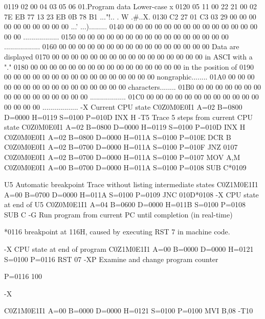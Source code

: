 0119 02 00 04 03 05 06 01.Program data         Lower-case x
0120 05 11 00 22 21 00 02 7E EB 77 13 23 EB 0B 78 B1 ..."!.. . W .#..X.
0130 C2 27 01 C3 03 29 00 00 00 00 00 00 00 00 00 00 ...' ...).........
0140 00 00 00 00 00 00 00 00 00 00 00 00 00 00 00 00 ..................
0150 00 00 00 00 00 00 00 00 00 00 00 00 00 00 00 00 ..................
0160 00 00 00 00 00 00 00 00 00 00 00 00 00 00 00 00 Data are displayed
0170 00 00 00 00 00 00 00 00 00 00 00 00 00 00 00 00 in ASCI with a "."
0180 00 00 00 00 00 00 00 00 00 00 00 00 00 00 00 00 in the position of
0190 00 00 00 00 00 00 00 00 00 00 00 00 00 00 00 00 nongraphic........
01A0 00 00 00 00 00 00 00 00 00 00 00 00 00 00 00 00 characters........
01B0 00 00 00 00 00 00 00 00 00 00 00 00 00 00 00 00 ..................
01C0 00 00 00 00 00 00 00 00 00 00 00 00 00 00 00 00 ..................
-X
           Current CPU state
C0Z0M0E0I1 A=02 B=0800 D=0000 H=0119 S=0100 P=010D INX H
-T5
     Trace 5 steps from current CPU state
C0Z0M0E0I1 A=02 B=0800 D=0000 H=0119 S=0100 P=010D INX H
C0Z0M0E0I1 A=02 B=0800 D=0000 H=011A S=0100 P=010E DCR B
C0Z0M0E0I1 A=02 B=0700 D=0000 H=011A S=0100 P=010F JNZ 0107
C0Z0M0E0I1 A=02 B=0700 D=0000 H=011A S=0100 P=0107 MOV A,M
C0Z0M0E0I1 A=00 B=0700 D=0000 H=011A S=0100 P=0108 SUB C*0109

U5
                                   Automatic breakpoint
     Trace without listing intermediate states
C0Z1M0E1I1 A=00 B=0700 D=0000 H=011A S=0100 P=0109 JNC 010D*0108
-X
                       CPU state at end of U5
C0Z0M0E1I1 A=04 B=0600 D=0000 H=011B S=0100 P=0108 SUB C
-G   Run program from current PC until completion (in real-time)

*0116   breakpoint at 116H, caused by executing RST 7 in machine code.

-X
     CPU state at end of program
C0Z1M0E1I1 A=00 B=0000 D=0000 H=0121 S=0100 P=0116 RST 07
-XP
     Examine and change program counter

P=0116 100

-X

C0Z1M0E1I1 A=00 B=0000 D=0000 H=0121 S=0100 P=0100 MVI B,08
-T10

